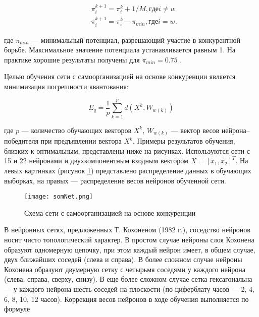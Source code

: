 \begin{equation}\label{eq:system}
		\begin{aligned}
		&	\pi _ { i } ^ { k + 1 } = \pi _ { i } ^ { k } + 1 / M, где i \neq w\\
		&   \pi _ { i } ^ { k + 1 } = \pi _ { i } ^ { k } - \pi _ { min }, где i = w.
		\end{aligned}  		
\end{equation}

где $\pi_{min}$ — минимальный потенциал, разрешающий участие в конкурентной борьбе. Максимальное значение потенциала устанавливается равным 1. На практике хорошие результаты получены для $\pi_{min} = 0.75$ .

Целью обучения сети с самоорганизацией на основе конкуренции является минимизация погрешности квантования:

\begin{equation}
 E _ { q } = \frac { 1 } { p } \sum _ { k = 1 } ^ { p } d \left( X ^ { k } , W _ { w ( k ) } \right)
\end{equation}

где $p$ — количество обучающих векторов $X^k$, $W_{w(k)}$ — вектор весов нейрона–победителя при предъявлении вектора $X^k$.
Примеры результатов обучения, близких к оптимальным, представлены
ниже на рисунках. Используются сети с 15 и 22 нейронами и двухкомпонентным входным вектором $X = \left[ x _ { 1 } , x _ { 2 } \right] ^ { T }$. На левых картинках (рисунок \ref{img:somNetr}) представлено распределение данных в обучающих выборках, на правых --- распределение весов нейронов обученной сети.

\begin{figure}[H]
\centering
\texttt{[image: somNet.png]}
\caption{Схема сети с самоорганизацией на основе конкуренции}
\label{img:somNetr}
\end{figure}

В нейронных сетях, предложенных Т. Кохоненом (1982 г.), соседство нейронов
носит чисто топологический характер. В простом случае нейроны
слоя Кохонена образуют одномерную цепочку, при этом каждый нейрон
имеет, в общем случае, двух ближайших соседей (слева и справа).
В более сложном случае нейроны Кохонена образуют двумерную сетку
с четырьмя соседями у каждого нейрона (слева, справа, сверху, снизу).
В еще более сложном случае сетка гексагональна — у каждого нейрона
шесть соседей на плоскости (по циферблату часов — 2, 4, 6, 8, 10, 12
часов).
Коррекция весов нейронов в ходе обучения выполняется по формуле


